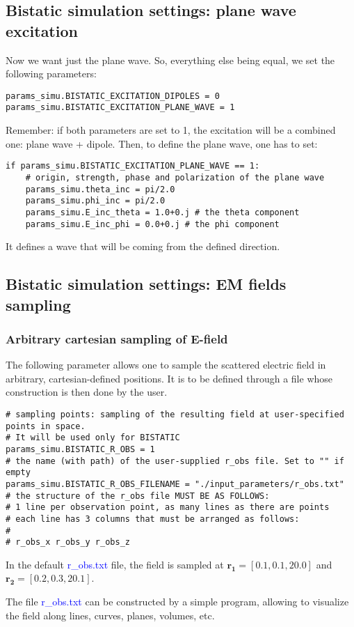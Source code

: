 \documentclass[a4paper,10pt]{book}
\newcommand{\file}[1] {\textcolor{blue}{\textsf{#1}}}
\begin{document}
\subsection{Bistatic simulation settings: plane wave excitation}
%
\par
Now we want just the plane wave. So, everything else being equal, we set the following parameters:
\begin{verbatim}
params_simu.BISTATIC_EXCITATION_DIPOLES = 0
params_simu.BISTATIC_EXCITATION_PLANE_WAVE = 1
\end{verbatim}
Remember: if both parameters are set to 1, the excitation will be a combined one: plane wave + dipole. Then, to define the plane wave, one has to set:
\begin{verbatim}
if params_simu.BISTATIC_EXCITATION_PLANE_WAVE == 1:
    # origin, strength, phase and polarization of the plane wave
    params_simu.theta_inc = pi/2.0
    params_simu.phi_inc = pi/2.0
    params_simu.E_inc_theta = 1.0+0.j # the theta component
    params_simu.E_inc_phi = 0.0+0.j # the phi component
\end{verbatim}
It defines a wave that will be coming from the defined direction.

\subsection{Bistatic simulation settings: EM fields sampling}

\subsubsection{Arbitrary cartesian sampling of E-field}
%
\par
The following parameter allows one to sample the scattered electric field in arbitrary, cartesian-defined positions. It is to be defined through a file whose construction is then done by the user.
\begin{verbatim}
# sampling points: sampling of the resulting field at user-specified points in space.
# It will be used only for BISTATIC
params_simu.BISTATIC_R_OBS = 1
# the name (with path) of the user-supplied r_obs file. Set to "" if empty
params_simu.BISTATIC_R_OBS_FILENAME = "./input_parameters/r_obs.txt"
# the structure of the r_obs file MUST BE AS FOLLOWS:
# 1 line per observation point, as many lines as there are points
# each line has 3 columns that must be arranged as follows:
#
# r_obs_x r_obs_y r_obs_z
\end{verbatim}
In the default \file{r\_obs.txt} file, the field is sampled at $\mathbf{r_1} = [0.1, 0.1, 20.0 ]$ and $\mathbf{r_2} = [0.2, 0.3, 20.1 ]$.
%
\par
The file \file{r\_obs.txt} can be constructed by a simple program, allowing to visualize the field along lines, curves, planes, volumes, etc. 
\end{document}
